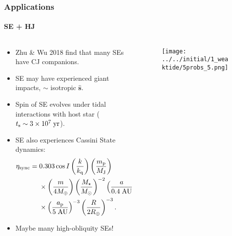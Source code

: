 \documentclass[dvipsnames, 9pt]{beamer}
\newcommand*{\scinot}[2]{#1\times10^{#2}}
\newcommand*{\bm}[1]{\boldsymbol{\mathbf{#1}}}
\newcommand*{\uv}[1]{\hat{\bm{#1}}}
\newcommand*{\p}[1]{\left(#1\right)}
\begin{document}
\begin{frame}
    \frametitle{Applications}
    \framesubtitle{SE + HJ}

    \begin{columns}
        \begin{column}{0.5\columnwidth}
            \begin{itemize}
                \item Zhu \& Wu 2018 find that many SEs have CJ companions.

                \item SE may have experienced giant impacts, $\sim$ isotropic
                    $\uv{s}$.

                \item Spin of SE evolves under tidal interactions with host
                    star ($t_{\rm s} \sim \scinot{3}{7}\;\mathrm{yr}$).

                \item SE also experiences Cassini State dynamics:
                    {\small\begin{align*}
                        \eta_{\rm sync} ={}& 0.303 \cos I
                                \p{\frac{k}{k_{\rm q}}}
                                \p{\frac{m_{\rm p}}{M_{\rm J}}}\nonumber\\
                            &\times \p{\frac{m}{4M_{\oplus}}}
                                \p{\frac{M_\star}{M_{\odot}}}^{-2}
                                \p{\frac{a}{0.4\;\mathrm{AU}}}^{6}\nonumber\\
                            &\times \p{\frac{a_{\rm p}}{5\;\mathrm{AU}}}^{-3}
                                \p{\frac{R}{2R_{\oplus}}}^{-3}.
                    \end{align*}}

                \item Maybe many high-obliquity SEs!
            \end{itemize}
        \end{column}
        \begin{column}{0.5\columnwidth}
            \begin{figure}
                \centering
                \texttt{[image: ../../initial/1\_weaktide/5probs\_5.png]}
            \end{figure}
        \end{column}
    \end{columns}
\end{frame}
\end{document}
